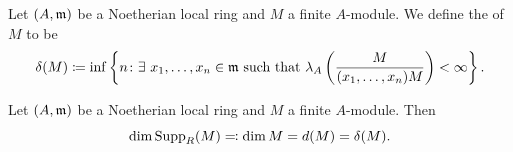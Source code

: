 \begin{definition}
    Let $(A,\mathfrak{m})$ be a Noetherian local ring and $M$ a finite $A$-module. We define the  of $M$ to be 
    \begin{equation*}
        \delta(M)\coloneq\inf\left\{n\colon\exists~x_1,\dots,x_n\in\mathfrak{m}\text{ such that }\lambda_A\left(\frac{M}{(x_1,\dots,x_n)M}\right) < \infty\right\}.
    \end{equation*}
\end{definition}

\begin{theorem}
    Let $(A,\mathfrak{m})$ be a Noetherian local ring and $M$ a finite $A$-module. Then 
    \begin{equation*}
        \dim\operatorname{Supp}_R(M) \eqcolon\dim M = d(M) = \delta(M).
    \end{equation*}
\end{theorem}
